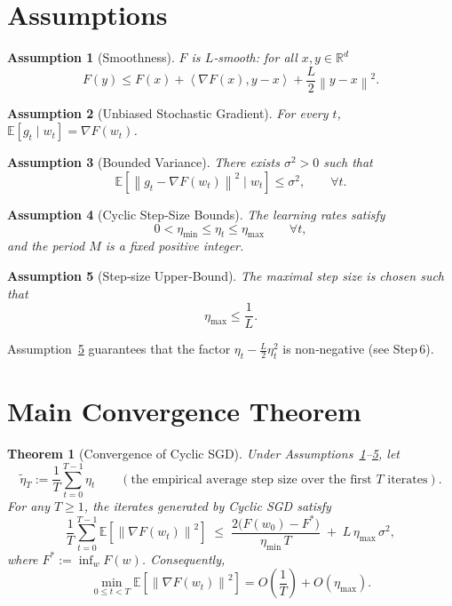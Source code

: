 \documentclass{article}
\newtheorem{theorem}{Theorem}
\newtheorem{assumption}{Assumption}
\newcommand{\E}{\mathbb{E}}
\newcommand{\R}{\mathbb{R}}
\newcommand{\norm}[1]{\left\|#1\right\|}
\newcommand{\inner}[2]{\left\langle #1,#2\right\rangle}
\begin{document}
\section*{Assumptions}
\begin{assumption}[Smoothness]\label{as:smooth}
$F$ is $L$‑smooth: for all $x,y\in\R^{d}$
\[
F(y)\le F(x)+\inner{\nabla F(x)}{y-x}+\frac{L}{2}\norm{y-x}^{2}.
\]
\end{assumption}
\begin{assumption}[Unbiased Stochastic Gradient]\label{as:unbiased}
For every $t$, $\E[g_{t}\mid w_{t}]=\nabla F(w_{t})$.
\end{assumption}
\begin{assumption}[Bounded Variance]\label{as:variance}
There exists $\sigma^{2}>0$ such that
\[
\E\!\left[\norm{g_{t}-\nabla F(w_{t})}^{2}\mid w_{t}\right]\le\sigma^{2},
\qquad\forall t.
\]
\end{assumption}
\begin{assumption}[Cyclic Step‑Size Bounds]\label{as:step}
The learning rates satisfy
\[
0<\eta_{\min}\le\eta_{t}\le\eta_{\max}\qquad\forall t,
\]
and the period $M$ is a fixed positive integer.
\end{assumption}
\begin{assumption}[Step‑size Upper‑Bound]\label{as:stepmax}
The maximal step size is chosen such that
\[
\eta_{\max}\le\frac{1}{L}.
\]
\end{assumption}
Assumption~\ref{as:stepmax} guarantees that the factor
$\eta_{t}-\frac{L}{2}\eta_{t}^{2}$ is non‑negative (see Step 6).

\section*{Main Convergence Theorem}
\begin{theorem}[Convergence of Cyclic SGD]\label{thm:main}
Under Assumptions~\ref{as:smooth}–\ref{as:stepmax}, let
\[
\tilde\eta_T:=\frac{1}{T}\sum_{t=0}^{T-1}\eta_{t}
\qquad(\text{the empirical average step size over the first $T$ iterates}).
\]
For any $T\ge1$, the iterates generated by Cyclic SGD satisfy
\begin{equation}\label{eq:bound}
\frac{1}{T}\sum_{t=0}^{T-1}\E\!\left[\norm{\nabla F(w_{t})}^{2}\right]
\;\le\;
\frac{2\big(F(w_{0})-F^{*}\big)}{\eta_{\min}\,T}
\;+\;
L\,\eta_{\max}\,\sigma^{2},
\end{equation}
where $F^{*}:=\inf_{w}F(w)$.  Consequently,
\[
\min_{0\le t<T}\E\!\left[\norm{\nabla F(w_{t})}^{2}\right]
=O\!\left(\frac{1}{T}\right)+O\!\left(\eta_{\max}\right).
\]
\end{theorem}
\end{document}
